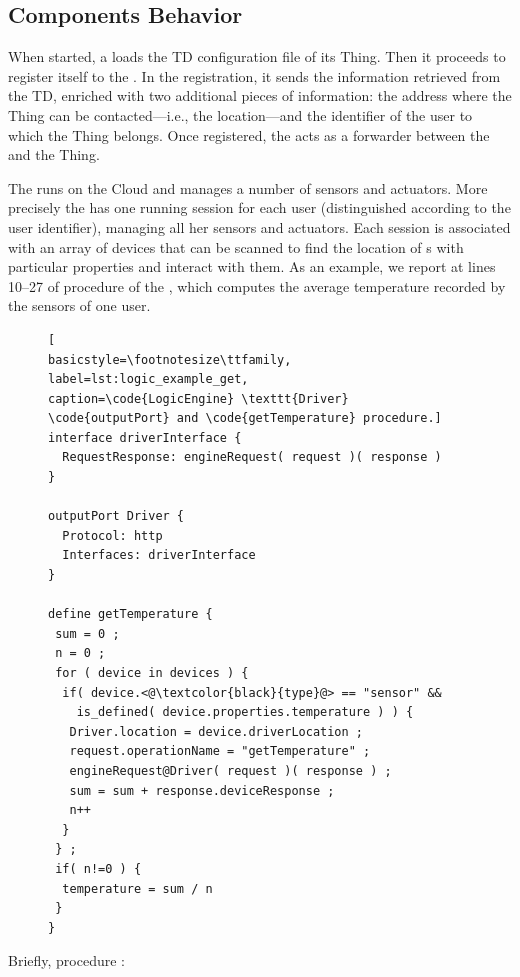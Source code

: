 %


\subsection{Components Behavior}

When started, a  loads the TD configuration file of its Thing.
Then it proceeds to register itself to the . In the
registration, it sends the information retrieved from the TD, enriched with two
additional pieces of information: the address where the Thing can be
contacted---i.e., the  location---and the identifier of the
user to which the Thing belongs. Once registered, the  acts as
a forwarder between the  and the Thing.

The  runs on the Cloud and manages a number of sensors and
actuators. More precisely the  has one running session for
each user (distinguished according to the user identifier), managing all her
sensors and actuators. Each session is associated with an array of devices
that can be scanned to find the location of s with particular
properties and interact with them. As an example, we report at lines 10--27 of
 procedure  of the
, which computes the average temperature recorded by the
sensors of one user.
%
\begin{figure}[b]
\begin{lstlisting}[
basicstyle=\footnotesize\ttfamily,
label=lst:logic_example_get,
caption=\code{LogicEngine} \texttt{Driver} \code{outputPort} and \code{getTemperature} procedure.]
interface driverInterface {
  RequestResponse: engineRequest( request )( response )
}

outputPort Driver {
  Protocol: http
  Interfaces: driverInterface
}

define getTemperature {
 sum = 0 ;
 n = 0 ;
 for ( device in devices ) {
  if( device.<@\textcolor{black}{type}@> == "sensor" &&
    is_defined( device.properties.temperature ) ) {
   Driver.location = device.driverLocation ;
   request.operationName = "getTemperature" ;
   engineRequest@Driver( request )( response ) ;
   sum = sum + response.deviceResponse ;
   n++
  }
 } ;
 if( n!=0 ) {
  temperature = sum / n
 }
}
\end{lstlisting}
\end{figure}
%
Briefly, procedure :


